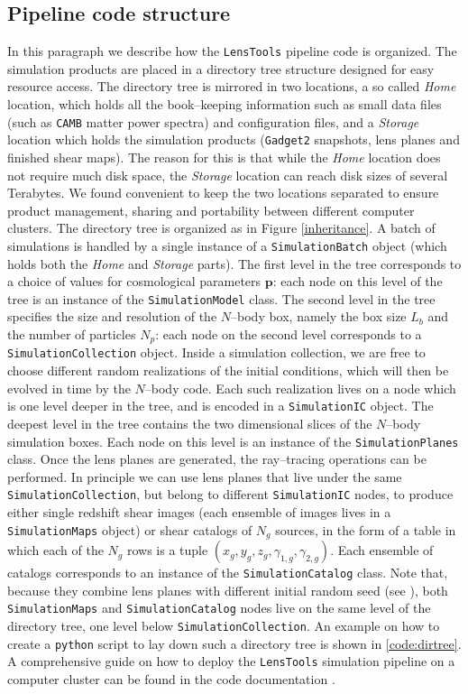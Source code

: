 \documentclass[5p]{elsarticle}
\newcommand{\bb}[1]{\mathbf{#1}}
\newcommand{\ttt}[1]{\texttt{#1}}
\newcommand{\LT}{\texttt{LensTools} }
\begin{document}
\subsection{Pipeline code structure}
%
In this paragraph we describe how the \LT pipeline code is organized. The simulation products are placed in a directory tree structure designed for easy resource access. The directory tree is mirrored in two locations, a so called \textit{Home} location, which holds all the book--keeping information such as small data files (such as \ttt{CAMB} matter power spectra) and configuration files, and a \textit{Storage} location which holds the simulation products (\ttt{Gadget2} snapshots, lens planes and finished shear maps). The reason for this is that while the \textit{Home} location does not require much disk space, the \textit{Storage} location can reach disk sizes of several Terabytes. We found convenient to keep the two locations separated to ensure product management, sharing and portability between different computer clusters. The directory tree is organized as in Figure \ref{inheritance}. 
A batch of simulations is handled by a single instance of a \ttt{SimulationBatch} object (which holds both the \textit{Home} and \textit{Storage} parts). The first level in the tree corresponds to a choice of values for cosmological parameters $\bb{p}$: each node on this level of the tree is an instance of the \ttt{SimulationModel} class. The second level in the tree specifies the size and resolution of the $N$--body box, namely the box size $L_b$ and the number of particles $N_p$: each node on the second level corresponds to a \ttt{SimulationCollection} object. Inside a simulation collection, we are free to choose different random realizations of the initial conditions, which will then be evolved in time by the $N$--body code. Each such realization lives on a node which is one level deeper in the tree, and is encoded in a \ttt{SimulationIC} object. The deepest level in the tree contains the two dimensional slices of the $N$--body simulation boxes. Each node on this level is an instance of the \ttt{SimulationPlanes} class. Once the lens planes are generated, the ray--tracing operations can be performed. In principle we can use lens planes that live under the same \ttt{SimulationCollection}, but belong to different \ttt{SimulationIC} nodes, to produce either single redshift shear images (each ensemble of images lives in a \ttt{SimulationMaps} object) or shear catalogs of $N_g$ sources, in the form of a table in which each of the $N_g$ rows is a tuple $(x_g,y_g,z_g,\gamma_{1,g},\gamma_{2,g})$. Each ensemble of catalogs corresponds to an instance of the \ttt{SimulationCatalog} class. Note that, because they combine lens planes with different initial random seed (see \citep{Petri16}), both \ttt{SimulationMaps} and \ttt{SimulationCatalog} nodes live on the same level of the directory tree, one level below \ttt{SimulationCollection}. An example on how to create a \ttt{python} script to lay down such a directory tree is shown in \ref{code:dirtree}. A comprehensive guide on how to deploy the \LT simulation pipeline on a computer cluster can be found in the code documentation \citep{lenstoolsdocs}.      
\end{document}
